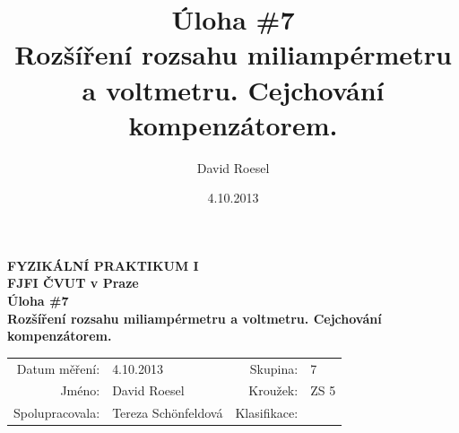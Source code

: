 \documentclass[english]{article}
\newcommand{\Author}{David Roesel}
\newcommand{\Coauthor}{Tereza Schönfeldová}
\newcommand{\Institute}{FJFI ČVUT v Praze}
\newcommand{\Subject}{FYZIKÁLNÍ PRAKTIKUM I}
\newcommand{\Group}{7}
\newcommand{\Circle}{ZS 5}
\newcommand{\Title}{Úloha \#7 \\Rozšíření rozsahu miliampérmetru a voltmetru. Cejchování kompenzátorem.}
\newcommand{\Date}{4.10.2013}
\begin{document}
\author{\Author}
\title{\Title}
\date{\Date}

\renewcommand{\figurename}{Obr.}
\renewcommand{\tablename}{Tab.}
\renewcommand{\refname}{Reference}


\setlength{\parindent}{0cm}
\begin{multicols}{2}
\textbf{\Subject \\
        \Institute \\[0.1cm]
\Title \\[0.5cm]
}
\begin{tabular}{rlrl}
\large Datum měření: & \Date & \large Skupina: & \Group \\
\large Jméno: & \Author & \large Kroužek:  & \Circle\\
\large Spolupracovala: & \Coauthor &\large Klasifikace:\\
\end{tabular}


\end{multicols}
\end{document}
